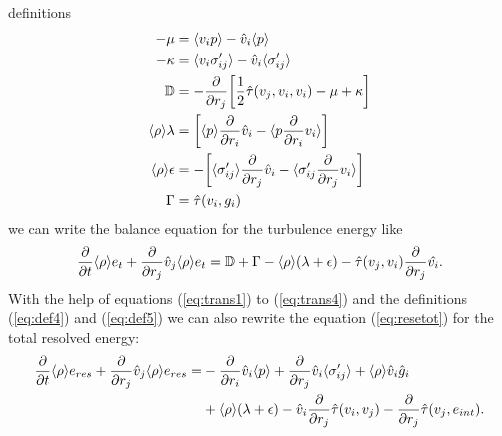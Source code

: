 definitions
\begin{align}
-\mu &=\langle v_i p \rangle-\hat{v}_i\langle p \rangle\\
-\kappa &=\langle v_i \sigma'_{ij} \rangle-\hat{v}_i\langle \sigma'_{ij} \rangle\\
\mathbb{D} &= -\frac{\partial}{\partial r_j}{ \left[ \frac{1}{2}\hat{\tau}(v_j,v_i,v_i) -\mu
+\kappa \right] }\\
\langle \rho \rangle \lambda &={ \left[ \langle p \rangle\frac{\partial}{\partial r_i}\hat{v}_i-\langle p \frac{\partial}{\partial r_i}
v_i \rangle \right] }\label{eq:def4}\\
\langle \rho \rangle \epsilon
&=-{ \left[ \langle \sigma'_{ij} \rangle\frac{\partial}{\partial r_j}\hat{v}_i-\langle \sigma'_{ij} \frac{\partial}{\partial r_j} v_i \rangle \right] }
\label{eq:def5}\\
\Gamma&=\hat{\tau}(v_i,g_i)
\end{align}
we can write the balance equation for the turbulence energy like
\begin{align}
\frac{\partial}{\partial t}\langle \rho \rangle e_t+\frac{\partial}{\partial r_j}\hat{v}_j
\langle \rho \rangle e_t=\mathbb{D}+\Gamma-\langle \rho \rangle(\lambda+\epsilon)
-\hat{\tau}(v_j,v_i)\frac{\partial}{\partial r_j}\hat{v_i}.\label{eq:et2}
\end{align}
With the help of equations (\ref{eq:trans1}) to (\ref{eq:trans4}) and the
definitions 
(\ref{eq:def4}) and (\ref{eq:def5}) we can also rewrite the equation
(\ref{eq:resetot}) for the total resolved energy:
\begin{align}
\begin{split}
\frac{\partial}{\partial t}\langle \rho \rangle e_{res}+\frac{\partial}{\partial r_j}\hat{v}_j\langle \rho \rangle e_{res}=&
-\frac{\partial}{\partial r_i}\hat{v}_i\langle p \rangle
+\frac{\partial}{\partial r_j}\hat{v}_i\langle \sigma'_{ij} \rangle+\langle \rho \rangle\hat{v}_i\hat{g}_i\\
&+\langle \rho \rangle(\lambda+\epsilon)
-\hat{v}_i\frac{\partial}{\partial r_j}\hat{\tau}(v_i,v_j)
-\frac{\partial}{\partial r_j}\hat{\tau}(v_j,e_{int}).\label{eq:resetot2}
\end{split}
\end{align}

